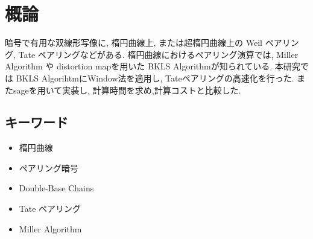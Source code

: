 \chapter*{概論}
暗号で有用な双線形写像に, 楕円曲線上, または超楕円曲線上の Weil ペアリング, Tate ペアリングなどがある. 楕円曲線におけるペアリング演算では, Miller Algorithm や distortion mapを用いた BKLS Algorithmが知られている. 本研究では BKLS AlgorihtmにWindow法を適用し, Tateペアリングの高速化を行った. またsageを用いて実装し, 計算時間を求め,計算コストと比較した.

\bigskip

\section*{キーワード}
\begin{itemize}
\item 楕円曲線
\item ペアリング暗号
\item Double-Base Chains
\item Tate  ペアリング
\item Miller Algorithm
\end{itemize}
